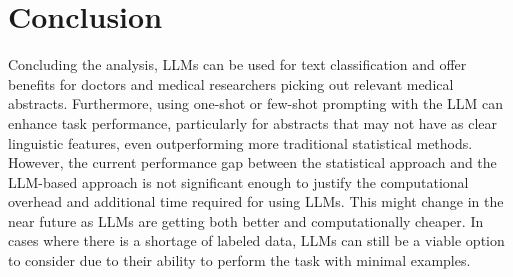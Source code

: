 \section{Conclusion}
\label{sec:conclusion}


Concluding the analysis, LLMs can be used for text classification and offer benefits for doctors and medical researchers picking out relevant medical abstracts. Furthermore, using one-shot or few-shot prompting with the LLM can enhance task performance, particularly for abstracts that may not have as clear linguistic features, even outperforming more traditional statistical methods. However, the current performance gap between the statistical approach and the LLM-based approach is not significant enough to justify the computational overhead and additional time required for using LLMs. This might change in the near future as LLMs are getting both better and computationally cheaper. In cases where there is a shortage of labeled data, LLMs can still be a viable option to consider due to their ability to perform the task with minimal examples.